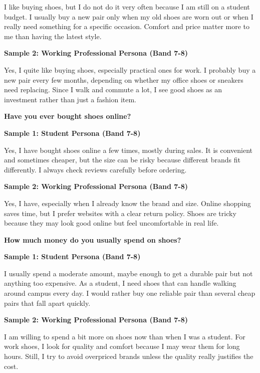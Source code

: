 I like buying shoes, but I do not do it very often because I am still on a student budget. I usually buy a new pair only when my old shoes are worn out or when I really need something for a specific occasion. Comfort and price matter more to me than having the latest style.

\textbf{Sample 2: Working Professional Persona (Band 7-8)}

Yes, I quite like buying shoes, especially practical ones for work. I probably buy a new pair every few months, depending on whether my office shoes or sneakers need replacing. Since I walk and commute a lot, I see good shoes as an investment rather than just a fashion item.

\separator

\begin{ieltsquestion}
\textbf{Have you ever bought shoes online?}
\end{ieltsquestion}
\textbf{Sample 1: Student Persona (Band 7-8)}

Yes, I have bought shoes online a few times, mostly during sales. It is convenient and sometimes cheaper, but the size can be risky because different brands fit differently. I always check reviews carefully before ordering.

\textbf{Sample 2: Working Professional Persona (Band 7-8)}

Yes, I have, especially when I already know the brand and size. Online shopping saves time, but I prefer websites with a clear return policy. Shoes are tricky because they may look good online but feel uncomfortable in real life.

\separator

\begin{ieltsquestion}
\textbf{How much money do you usually spend on shoes?}
\end{ieltsquestion}
\textbf{Sample 1: Student Persona (Band 7-8)}

I usually spend a moderate amount, maybe enough to get a durable pair but not anything too expensive. As a student, I need shoes that can handle walking around campus every day. I would rather buy one reliable pair than several cheap pairs that fall apart quickly.

\textbf{Sample 2: Working Professional Persona (Band 7-8)}

I am willing to spend a bit more on shoes now than when I was a student. For work shoes, I look for quality and comfort because I may wear them for long hours. Still, I try to avoid overpriced brands unless the quality really justifies the cost.

